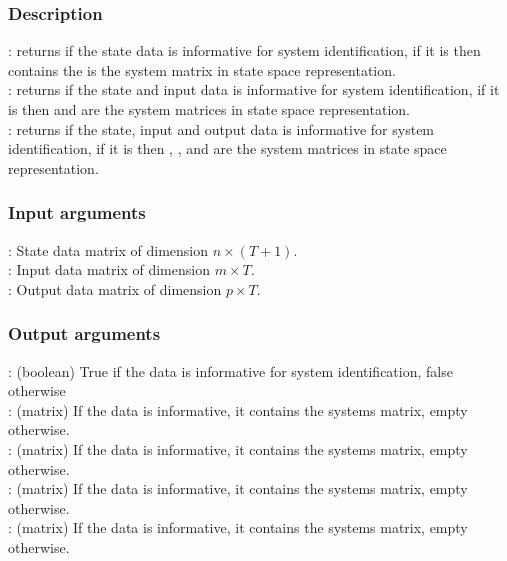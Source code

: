 \subsubsection*{Description}
: returns if the state data is informative for system identification, if it is then  contains the  is the system matrix in state space representation.\\
: returns if the state and input data is informative for system identification, if it is then  and  are the system matrices in state space representation.\\
: returns if the state, input and output data is informative for system identification, if it is then , ,  and  are the system matrices in state space representation.

\subsubsection*{Input arguments}
\textbf{}: State data matrix of dimension $n \times (T+1)$.\\
\textbf{}: Input data matrix of dimension $m \times T$.\\
\textbf{}: Output data matrix of dimension $p \times T$.

\subsubsection*{Output arguments}
\textbf{}: (boolean) True if the data is informative for system identification, false otherwise\\
\textbf{}: (matrix) If the data is informative, it contains the systems  matrix, empty otherwise.\\
\textbf{}: (matrix) If the data is informative, it contains the systems  matrix, empty otherwise.\\
\textbf{}: (matrix) If the data is informative, it contains the systems  matrix, empty otherwise.\\
\textbf{}: (matrix) If the data is informative, it contains the systems  matrix, empty otherwise.


